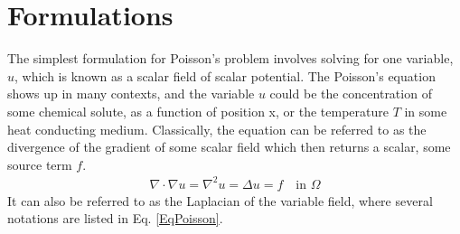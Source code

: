 \documentclass[12pt,3p]{article}
\begin{document}
\section{Formulations}
\vspace{-2ex}
The simplest formulation for Poisson's problem involves solving for one variable, $u$, which is known as a scalar field of scalar potential. The Poisson's equation shows up in many contexts, and the variable $u$ could be the concentration of some chemical solute, as a function of position x, or the temperature $T$ in some heat conducting medium. Classically, the equation can be referred to as the divergence of the gradient of some scalar field which then returns a scalar, some source term $f$.
\begin{subequations}\label{EqPoisson}
\begin{align}
\nabla \cdot \nabla u = \nabla^2 u = \Delta u = f \quad \text{in } \Omega 
\end{align}
\end{subequations}
It can also be referred to as the Laplacian of the variable field, where several notations are listed in Eq. \ref{EqPoisson}.


\end{document}
